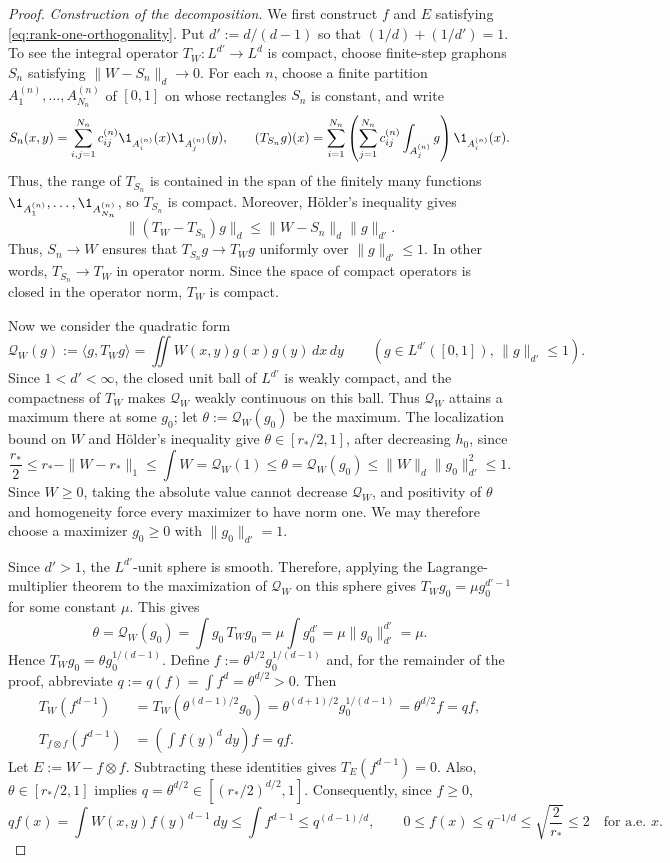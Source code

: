 \begin{proof}
\medskip
\noindent\emph{Construction of the decomposition.}
We first construct $f$ and $E$ satisfying \eqref{eq:rank-one-orthogonality}.
Put $d':=d/(d-1)$ so that $(1/d)+(1/d')=1$.
To see the integral operator $T_W:L^{d'}\longrightarrow L^d$ is compact,
choose finite-step graphons $S_n$ satisfying
$\|W-S_n\|_d\to0$.  For each $n$, choose a finite partition
$A_1^{(n)},\ldots,A_{N_n}^{(n)}$ of $[0,1]$ on whose rectangles $S_n$ is
constant, and write
\[
  S_n(x,y)=\sum_{i,j=1}^{N_n}c_{ij}^{(n)}
  \1_{A_i^{(n)}}(x)\1_{A_j^{(n)}}(y),
  \qquad
  (T_{S_n}g)(x)=\sum_{i=1}^{N_n} \left(\sum_{j=1}^{N_n}c_{ij}^{(n)}\int_{A_j^{(n)}}g\right) \1_{A_i^{(n)}}(x).
\]
Thus, the range of $T_{S_n}$ is contained in the span of the finitely many
functions $\1_{A_1^{(n)}},\ldots,\1_{A_{N_n}^{(n)}}$, so $T_{S_n}$ is compact.
Moreover, H\"older's inequality gives
\[
  \|(T_W-T_{S_n})g\|_d
  \le\|W-S_n\|_d\|g\|_{d'}.
\]
Thus, $S_n\to W$ ensures that $T_{S_n}g\to T_Wg$ uniformly over
$\|g\|_{d'}\le1$.  In other words, $T_{S_n}\to T_W$ in operator norm.
Since the space of compact
operators is closed in the operator norm, $T_W$ is compact.

Now we consider the quadratic form
\[
  \mathcal Q_W(g):= \langle g,T_Wg\rangle =\iint W(x,y)g(x)g(y)\,dx\,dy
  \qquad
  (g \in L^{d'}([0,1]),\, \|g\|_{d'}\le1).
\]
Since $1<d'<\infty$, the closed unit ball of $L^{d'}$ is weakly compact,
and the compactness of $T_W$ makes $\mathcal Q_W$ weakly continuous on this ball.
Thus $\mathcal Q_W$ attains a maximum there at some $g_0$;
let $\theta:=\mathcal Q_W(g_0)$ be the maximum.
The localization bound on $W$ and H\"older's inequality give $\theta \in [r_*/2,1]$,
after decreasing $h_0$, since
\[
  \frac{r_*}{2} \le r_*-\|W-r_*\|_1 \le \int W=\mathcal Q_W(1)\le\theta
  = \mathcal Q_W(g_0)\le\|W\|_d\|g_0\|_{d'}^2\le 1.
\]
Since $W\ge0$, taking the absolute value cannot decrease $\mathcal Q_W$,
and positivity of $\theta$ and homogeneity force every maximizer to have norm
one.  We may therefore choose a maximizer $g_0\ge0$ with $\|g_0\|_{d'}=1$.

Since \(d'>1\), the \(L^{d'}\)-unit sphere is smooth.  Therefore, applying the
Lagrange-multiplier theorem to the maximization of $\mathcal Q_W$ on this sphere
gives \(T_Wg_0=\mu g_0^{d'-1}\) for some constant \(\mu\). This gives
\[
  \theta=\mathcal Q_W(g_0)=\int g_0\,T_Wg_0
  =\mu\int g_0^{d'}=\mu\|g_0\|_{d'}^{d'}=\mu.
\]
Hence $T_Wg_0=\theta g_0^{1/(d-1)}$.
Define $f:=\theta^{1/2}g_0^{1/(d-1)}$ and, for the remainder of the proof,
abbreviate $q:=q(f)=\int f^d=\theta^{d/2}>0$.  Then
\begin{align*}
  T_W(f^{d-1})
  &=T_W(\theta^{(d-1)/2}g_0)
  =\theta^{(d+1)/2}g_0^{1/(d-1)}
  =\theta^{d/2}f=qf,
  \\
  T_{f\otimes f}(f^{d-1})
  &=\left(\int f(y)^d\,dy\right)f
  =qf.
\end{align*}
Let $E:=W-f\otimes f$.  Subtracting these identities gives $T_E(f^{d-1})=0$.
Also, $\theta \in [r_*/2,1]$ implies $q = \theta^{d/2} \in [(r_*/2)^{d/2},1]$.
Consequently, since $f\ge0$,
\[
  qf(x)=\int W(x,y)f(y)^{d-1}\,dy
  \le\int f^{d-1}\le q^{(d-1)/d},
  \qquad
  0\le f(x)\le q^{-1/d}\le\sqrt{\frac{2}{r_*}} \le 2
  \quad\text{for a.e. }x.
\]


\end{proof}
